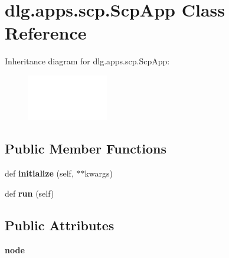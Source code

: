 \hypertarget{classdlg_1_1apps_1_1scp_1_1_scp_app}{}\section{dlg.\+apps.\+scp.\+Scp\+App Class Reference}
\label{classdlg_1_1apps_1_1scp_1_1_scp_app}
Inheritance diagram for dlg.\+apps.\+scp.\+Scp\+App\+:\begin{figure}[H]
\begin{center}
\leavevmode
\includegraphics[height=2.000000cm]{classdlg_1_1apps_1_1scp_1_1_scp_app}
\end{center}
\end{figure}
\subsection*{Public Member Functions}
\begin{DoxyCompactItemize}
\item 
\mbox{\label{classdlg_1_1apps_1_1scp_1_1_scp_app_a9674f6bbc314dedd16384d9e9ca3f531}} 
def {\bfseries initialize} (self, $\ast$$\ast$kwargs)
\item 
\mbox{\label{classdlg_1_1apps_1_1scp_1_1_scp_app_a572dbf6846869e13bc2cbefc48b73b45}} 
def {\bfseries run} (self)
\end{DoxyCompactItemize}
\subsection*{Public Attributes}
\begin{DoxyCompactItemize}
\item 
\mbox{\label{classdlg_1_1apps_1_1scp_1_1_scp_app_abd5de750a84ac2c43ef685e97c1155a5}} 
{\bfseries node}
\end{DoxyCompactItemize}
